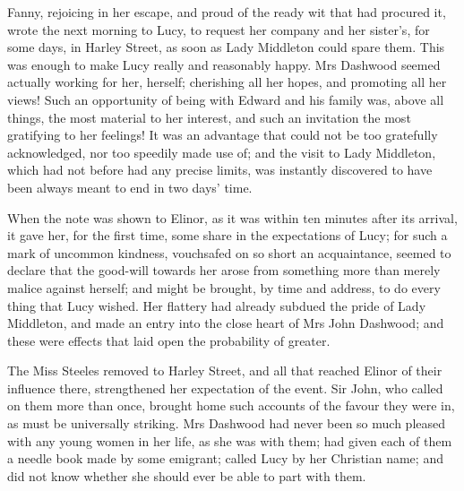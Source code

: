 Fanny, rejoicing in her escape, and proud of the ready wit that had procured it, wrote the next morning to Lucy, to request her company and her sister’s, for some days, in Harley Street, as soon as Lady Middleton could spare them. This was enough to make Lucy really and reasonably happy. Mrs Dashwood seemed actually working for her, herself; cherishing all her hopes, and promoting all her views! Such an opportunity of being with Edward and his family was, above all things, the most material to her interest, and such an invitation the most gratifying to her feelings! It was an advantage that could not be too gratefully acknowledged, nor too speedily made use of; and the visit to Lady Middleton, which had not before had any precise limits, was instantly discovered to have been always meant to end in two days’ time.

When the note was shown to Elinor, as it was within ten minutes after its arrival, it gave her, for the first time, some share in the expectations of Lucy; for such a mark of uncommon kindness, vouchsafed on so short an acquaintance, seemed to declare that the good-will towards her arose from something more than merely malice against herself; and might be brought, by time and address, to do every thing that Lucy wished. Her flattery had already subdued the pride of Lady Middleton, and made an entry into the close heart of Mrs John Dashwood; and these were effects that laid open the probability of greater.

The Miss Steeles removed to Harley Street, and all that reached Elinor of their influence there, strengthened her expectation of the event. Sir John, who called on them more than once, brought home such accounts of the favour they were in, as must be universally striking. Mrs Dashwood had never been so much pleased with any young women in her life, as she was with them; had given each of them a needle book made by some emigrant; called Lucy by her Christian name; and did not know whether she should ever be able to part with them.